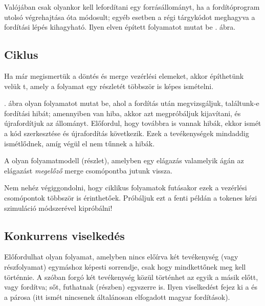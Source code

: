 \begin{pelda}
Valójában csak olyankor kell lefordítani egy forrásállományt, ha a fordítóprogram utolsó végrehajtása óta módosult; egyéb esetben a régi tárgykódot meghagyva a fordítási lépés kihagyható. Ilyen elven épített folyamatot mutat be . ábra.  
\end{pelda}



\subsection{Ciklus}
Ha már megismertük a döntés és merge vezérlési elemeket, akkor építhetünk velük t, amely a folyamat egy részletét többször is képes ismételni. 

\begin{pelda}
. ábra olyan folyamatot mutat be, ahol a fordítás után megvizsgáljuk, találtunk-e fordítási hibát; amennyiben van hiba, akkor azt megpróbáljuk kijavítani, és újrafordítjuk az állományt. Előfordul, hogy továbbra is vannak hibák, ekkor ismét a kód szerkesztése és újrafordítás következik. Ezek a tevékenységek mindaddig ismétlődnek, amíg végül el nem tűnnek a hibák.
\end{pelda}


\begin{definicio}
	A  olyan folyamatmodell (részlet), amelyben egy elágazás valamelyik ágán az elágazást \emph{megelőző} merge csomópontba jutunk vissza.
\end{definicio}

Nem nehéz végiggondolni, hogy ciklikus folyamatok futásakor ezek a vezérlési csomópontok többször is érinthetőek. Próbáljuk ezt a fenti példán a tokenes kézi szimuláció módszerével kipróbálni!

\subsection{Konkurrens viselkedés}
Előfordulhat olyan folyamat, amelyben nincs előírva két tevékenység (vagy részfolyamat) egymáshoz képesti sorrendje, csak hogy mindkettőnek meg kell történnie. A szóban forgó két tevékenység közül történhet az egyik a másik előtt, vagy fordítva; sőt, futhatnak (részben) egyszerre is. Ilyen viselkedést fejez ki a  és a  párosa (itt ismét nincsenek általánosan elfogadott magyar fordítások).

